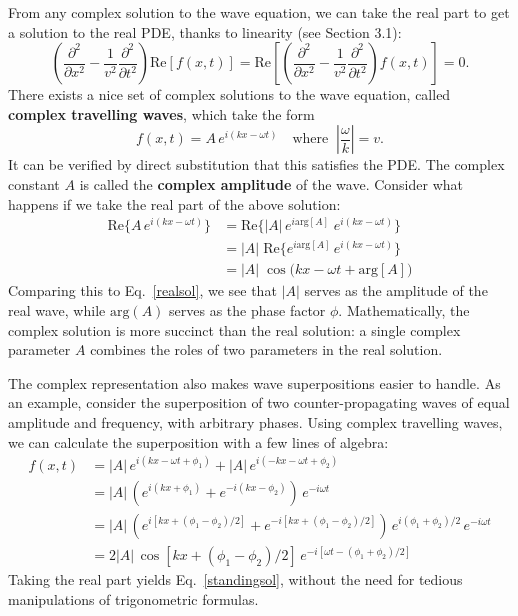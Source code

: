 \documentclass[10pt,a4paper]{article}
\begin{document}
From any complex solution to the wave equation, we can take the real
part to get a solution to the real PDE, thanks to linearity (see
Section 3.1):
\begin{equation}
\left(\frac{\partial^2}{\partial x^2} - \frac{1}{v^2} \frac{\partial^2}{\partial t^2}\right) \mathrm{Re}\left[f(x,t)\right] = \mathrm{Re} \left[ \left(\frac{\partial^2}{\partial x^2} - \frac{1}{v^2} \frac{\partial^2}{\partial t^2}\right) f(x,t)\right] = 0.
\end{equation}
There exists a nice set of complex solutions to the wave equation,
called \textbf{complex travelling waves}, which take the form
\begin{equation}
f(x,t) = A \, e^{i(kx - \omega t)} \quad\mathrm{where}\;\; \left|\frac{\omega}{k}\right| = v.
\end{equation}
It can be verified by direct substitution that this satisfies the PDE.
The complex constant $A$ is called the \textbf{complex amplitude} of
the wave. Consider what happens if we take the real part of the above
solution:
\begin{equation}
\begin{aligned}\mathrm{Re}\Big\{A \, e^{i(kx - \omega t)}\Big\} &= \mathrm{Re}\Big\{ |A|\, e^{i\mathrm{arg}[A]} \; e^{i(kx - \omega t)}\Big\} \\ &= \big|A\big|\; \mathrm{Re}\Big\{ e^{i\mathrm{arg}[A]} \, e^{i(kx - \omega t)}\Big\} \\ &= \big|A\big|\; \cos\big(kx - \omega t + \mathrm{arg}[A]\big)\end{aligned}
\end{equation}
Comparing this to Eq.~\eqref{realsol}, we see that $|A|$ serves as the
amplitude of the real wave, while $\mathrm{arg}(A)$ serves as the
phase factor $\phi$. Mathematically, the complex solution is more
succinct than the real solution: a single complex parameter $A$
combines the roles of two parameters in the real solution.

The complex representation also makes wave superpositions easier to
handle. As an example, consider the superposition of two
counter-propagating waves of equal amplitude and frequency, with
arbitrary phases. Using complex travelling waves, we can calculate the
superposition with a few lines of algebra:
\begin{equation}
\begin{aligned}f(x,t) &= \displaystyle \big|A\big| \, e^{i(kx - \omega t + \phi_1)} + \big|A\big| \, e^{i(-kx - \omega t + \phi_2)} \\ &= \displaystyle \big|A\big|\, \left(e^{i(kx + \phi_1)} + e^{-i(kx - \phi_2)}\right)\, e^{-i\omega t} \\ &= \displaystyle \big|A\big|\, \left(e^{i[kx + (\phi_1-\phi_2)/2]} + e^{-i[kx + (\phi_1 - \phi_2)/2]}\right)\, e^{i(\phi_1 + \phi_2)/2} \,e^{-i\omega t} \\ &= \displaystyle 2\big|A\big|\, \cos\left[kx + (\phi_1-\phi_2)/2\right] \,e^{-i[\omega t -(\phi_1+\phi_2)/2]}\end{aligned}
\end{equation}
Taking the real part yields Eq.~\eqref{standingsol}, without the need
for tedious manipulations of trigonometric formulas.
\end{document}

